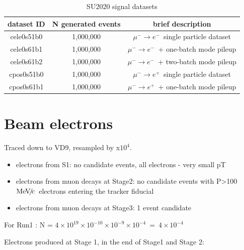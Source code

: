 \documentclass[12pt]{article}
\newcommand {\MeVc}       {\mbox{$\rm MeV\!/\!c$}}
\newcommand {\MuToEm}     {\mbox{$\mu^- \ra e^-$}}
\newcommand {\MuToEp}     {\mbox{$\mu^- \ra e^+$}}
\newcommand {\ra}        {\rightarrow}
\begin{document}
\begin{table}[H]
  { \renewcommand{\arraystretch}{1.0}   %
    \begin{center}
      \begin{tabular}{|c|c|c|}
        \hline
        dataset ID   & N generated events  &  brief description                  \\
        \hline
        cele0s51b0   &  1,000,000          &  \MuToEm\  single particle dataset  \\
        cele0s61b1   &  1,000,000          &  \MuToEm\  + one-batch mode pileup    \\
        cele0s61b2   &  1,000,000          &  \MuToEm\  + two-batch mode pileup    \\
        \hline
        cpos0s51b0   &  1,000,000          &  \MuToEp\  single particle dataset  \\
        cpos0s61b1   &  1,000,000          &  \MuToEp\  + one-batch mode pileup    \\
        \hline
      \end{tabular}
    \end{center}
  }
  \caption{
    \label{tab:datasets}
    SU2020 signal datasets
  }
\end{table}



\section {Beam electrons}

Traced down to VD9, resampled by x$10^4$.

\begin{itemize}
\item 
  electrons from S1: no candidate events, all electrons - very small pT
\item
  electrons from muon decays at Stage2:  no candidate events with P>100 \MeVc\ electrons entering 
  the tracker fiducial
\item
  electrons from muon decays at Stage3: 1 event candidate
\end{itemize}

For Run1 : N  = $4 \times 10^{19} \times 10^{-10} \times 10^{-9} \times 10^{-4}  ~=~ 4 \times 10^{-4}$


Electrons produced at Stage 1, in the end of Stage1 and Stage 2:
\end{document}
